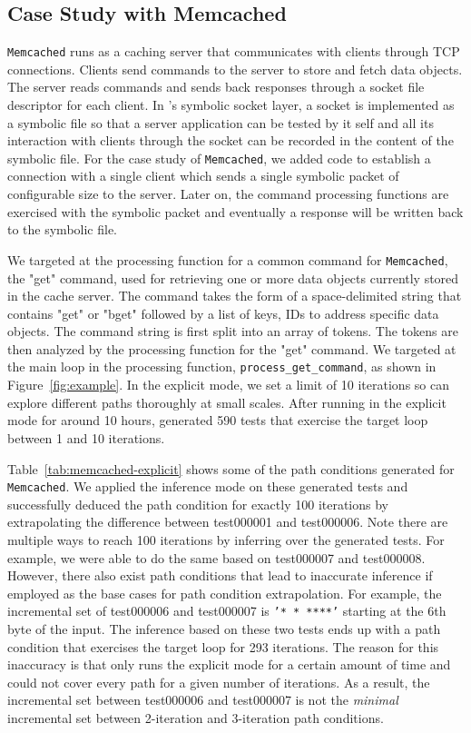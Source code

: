 \subsection{Case Study with Memcached}

{\tt Memcached} runs as a caching server that communicates with clients through TCP connections. Clients send commands to the server to store and fetch data objects. The server reads commands and sends back responses through a socket file descriptor for each client. In \lancet's symbolic socket layer, a socket is implemented as a symbolic file so that a server application can be tested by it self and all its interaction with clients through the socket can be recorded in the content of the symbolic file. For the case study of {\tt Memcached}, we added code to establish a connection with a single client which sends a single symbolic packet of configurable size to the server. Later on, the command processing functions are exercised with the symbolic packet and eventually a response will be written back to the symbolic file.

We targeted at the processing function for a common command for {\tt Memcached}, the "get" command, used for retrieving one or more data objects currently stored in the cache server. The command takes the form of a space-delimited string that contains "get" or "bget" followed by a list of keys, IDs to address specific data objects. The command string is first split into an array of tokens. The tokens are then analyzed by the processing function for the "get" command. We targeted at the main loop in the processing function, {\tt process\_get\_command}, as shown in Figure~\ref{fig:example}. In the explicit mode, we set a limit of 10 iterations so \lancet can explore different paths thoroughly at small scales. After running in the explicit mode for around 10 hours, \lancet generated 590 tests that exercise the target loop between 1 and 10 iterations.

Table~\ref{tab:memcached-explicit} shows some of the path conditions \lancet generated for {\tt Memcached}. We applied the inference mode on these generated tests and successfully deduced the path condition for exactly 100 iterations by extrapolating the difference between test000001 and test000006. Note there are multiple ways to reach 100 iterations by inferring over the generated tests. For example, we were able to do the same based on test000007 and test000008. However, there also exist path conditions that lead to inaccurate inference if employed as the base cases for path condition extrapolation. For example, the incremental set of test000006 and test000007 is {\tt '* * ****'} starting at the 6th byte of the input. The inference based on these two tests ends up with a path condition that exercises the target loop for 293 iterations. The reason for this inaccuracy is that \lancet only runs the explicit mode for a certain amount of time and could not cover every path for a given number of iterations. As a result, the incremental set between test000006 and test000007 is not the {\em minimal} incremental set between 2-iteration and 3-iteration path conditions.


